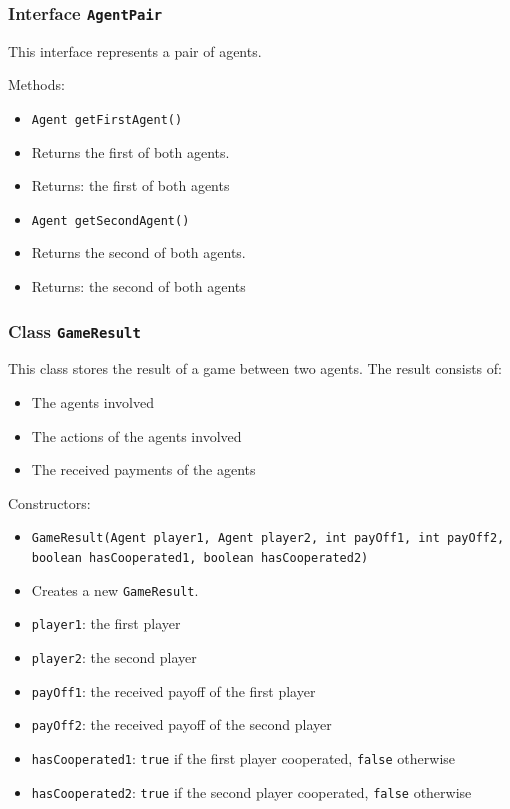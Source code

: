 \documentclass[parskip=full,11pt]{scrartcl}
\begin{document}
\subsubsection{Interface \texttt{AgentPair}}
This interface represents a pair of agents.

Methods:
\begin{itemize}\itemsep -10pt
\item \texttt{Agent getFirstAgent()}
\item[] Returns the first of both agents.
\item[] Returns: the first of both agents

\item \texttt{Agent getSecondAgent()}
\item[] Returns the second of both agents.
\item[] Returns: the second of both agents
\end{itemize}

\subsubsection{Class \texttt{GameResult}}

This class stores the result of a game between two agents. The result consists of:
\begin{itemize}\itemsep -10pt
	\item The agents involved
	\item The actions of the agents involved
	\item The received payments of the agents
\end{itemize}

Constructors:
\begin{itemize}\itemsep -10pt
\item \texttt{GameResult(Agent player1, Agent player2, int payOff1, int payOff2, boolean hasCooperated1, boolean hasCooperated2)}
\item[] Creates a new \texttt{GameResult}.
\item[] \texttt{player1}: the first player
\item[] \texttt{player2}: the second player
\item[] \texttt{payOff1}: the received payoff of the first player
\item[] \texttt{payOff2}: the received payoff of the second player
\item[] \texttt{hasCooperated1}: \texttt{true} if the first player cooperated, \texttt{false} otherwise
\item[] \texttt{hasCooperated2}: \texttt{true} if the second player cooperated, \texttt{false} otherwise
\end{itemize}
\end{document}
